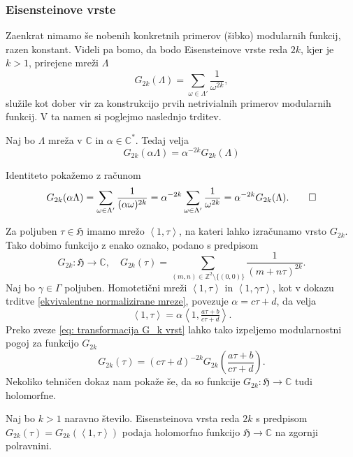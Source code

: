 \documentclass[mat1]{fmfdelo}
\numberwithin{equation}{section}
\newcommand{\Z}{\mathbb Z}
\newcommand{\C}{\mathbb C}
\newcommand{\HH}{\mathfrak{H}}
\newcommand{\CM}{\mathbb C ^*}
\newcommand{\om}{\omega}
\newcommand{\SL}{\Gamma}
\newcommand{\lattice}[2]{\left\langle #1, #2 \right\rangle}
\theoremstyle{definition}
\begin{document}
\subsubsection*{Eisensteinove vrste}
Zaenkrat nimamo še nobenih konkretnih primerov (šibko) modularnih funkcij, razen konstant. Videli pa bomo, da bodo Eisensteinove vrste reda $2k$, kjer je $k > 1$, prirejene mreži $\Lambda$
\[
    G_{2k}(\Lambda) = \sum_{\om\in\Lambda'}\frac{1}{\om^{2k}},
\]
služile kot dober vir za konstrukcijo prvih netrivialnih primerov modularnih funkcij. V ta namen si poglejmo naslednjo trditev.

\begin{trditev}
    Naj bo $\Lambda$ mreža v $\C$ in $\alpha \in \CM$. Tedaj velja
    \begin{equation}
    \label{eq: transformacija G_k vrst}
        G_{2k}(\alpha\Lambda) = \alpha^{-2k}G_{2k}(\Lambda)
    \end{equation}
\end{trditev}

\begin{dokaz}
    Identiteto pokažemo z računom
    \[
        G_{2k}(\alpha\Lambda) = \sum_{\om\in\Lambda'}\frac{1}{(\alpha\om)^{2k}} = \alpha^{-2k}\sum_{\om\in\Lambda'}\frac{1}{\om^{2k}} = \alpha^{-2k}G_{2k}(\Lambda). \qedhere
    \]
\end{dokaz}
Za poljuben $\tau \in \HH$ imamo mrežo $\lattice{1}{\tau}$, na kateri lahko izračunamo vrsto $G_{2k}$. Tako dobimo funkcijo z enako oznako, podano s predpisom
\[
    G_{2k} : \HH \to \C, \quad G_{2k}(\tau) = \sum_{(m,n) \in \Z^2\setminus\{(0,0)\}} \frac{1}{(m + n\tau)^{2k}}.
\]
Naj bo $\gamma \in \SL$ poljuben. Homotetični mreži $\lattice{1}{\tau}$ in $\lattice{1}{\gamma\tau}$, kot v dokazu trditve \ref{ekvivalentne normalizirane mreze}, povezuje $\alpha = c\tau + d$, da velja
\[
    \lattice{1}{\tau} = \alpha\lattice{1}{\tfrac{a\tau + b}{c\tau + d}}.
\]
Preko zveze \eqref{eq: transformacija G_k vrst} lahko tako izpeljemo modularnostni pogoj za funkcijo $G_{2k}$
\[
    G_{2k}(\tau) = (c\tau + d)^{-2k}G_{2k}\left(\frac{a\tau + b}{c\tau + d}\right).
\]
Nekoliko tehničen dokaz
nam pokaže še, da so funkcije $G_{2k} : \HH \to \C$ tudi holomorfne.

\begin{trditev}
    \label{holomorfnost Gk}
    Naj bo $k > 1$ naravno število. Eisensteinova vrsta reda $2k$ s predpisom $G_{2k}(\tau) = G_{2k}(\lattice{1}{\tau})$ podaja holomorfno funkcijo $\HH \to \C$ na zgornji polravnini.
\end{trditev}
\end{document}
